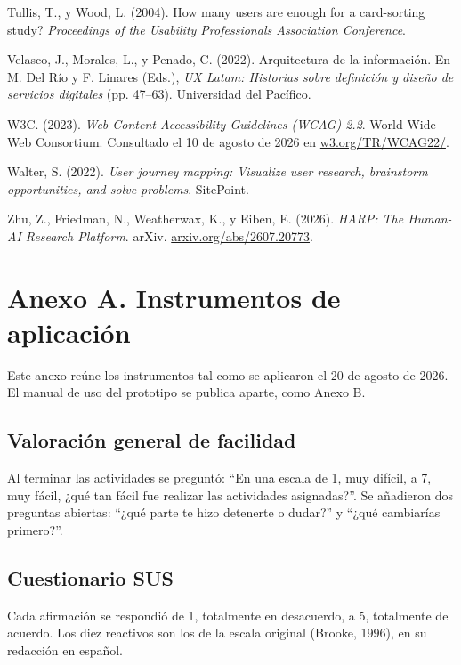 \begin{uxreferencias}
Tullis, T., y Wood, L. (2004). How many users are enough for a card-sorting study?
\textit{Proceedings of the Usability Professionals Association Conference}.

Velasco, J., Morales, L., y Penado, C. (2022). Arquitectura de la información. En M. Del Río y
F. Linares (Eds.), \textit{UX Latam: Historias sobre definición y diseño de servicios digitales}
(pp. 47--63). Universidad del Pacífico.

W3C. (2023). \textit{Web Content Accessibility Guidelines (WCAG) 2.2}. World Wide Web Consortium.
Consultado el 10 de agosto de 2026 en \href{https://www.w3.org/TR/WCAG22/}{w3.org/TR/WCAG22/}.

Walter, S. (2022). \textit{User journey mapping: Visualize user research, brainstorm
opportunities, and solve problems}. SitePoint.

Zhu, Z., Friedman, N., Weatherwax, K., y Eiben, E. (2026). \textit{HARP: The Human-AI Research
Platform}. arXiv. \href{https://arxiv.org/abs/2607.20773}{arxiv.org/abs/2607.20773}.
\end{uxreferencias}

\clearpage
\section{Anexo A. Instrumentos de aplicación}

Este anexo reúne los instrumentos tal como se aplicaron el 20 de agosto de 2026. El manual de uso
del prototipo se publica aparte, como Anexo B.

\subsection{Valoración general de facilidad}

Al terminar las actividades se preguntó: ``En una escala de 1, muy difícil, a 7, muy fácil,
¿qué tan fácil fue realizar las actividades asignadas?''. Se añadieron dos preguntas abiertas:
``¿qué parte te hizo detenerte o dudar?'' y ``¿qué cambiarías primero?''.

\subsection{Cuestionario SUS}

Cada afirmación se respondió de 1, totalmente en desacuerdo, a 5, totalmente de acuerdo. Los diez
reactivos son los de la escala original (Brooke, 1996), en su redacción en español.

